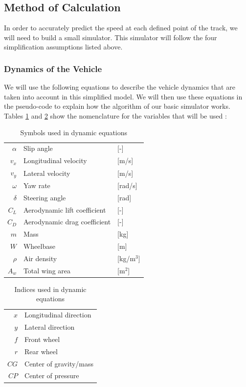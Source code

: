 \documentclass[a4paper, 11pt]{article}
\begin{document}
\subsection{Method of Calculation}

In order to accurately predict the speed at each defined point of the track, we will need to build a small simulator. This simulator will follow the four simplification assumptions listed above. 

\subsubsection{Dynamics of the Vehicle}

We will use the following equations to describe the vehicle dynamics that are taken into account in this simplified model. We will then use these equations in the pseudo-code to explain how the algorithm of our basic simulator works. Tables \ref{tab:DynamicSymbols} and \ref{tab:DynamicIndices} show the nomenclature for the variables that will be used :
\begin{table}[H]
	\centering
	\begin{tabular}{r | l  l}
		$\alpha$ & Slip angle & [-]\\
		$v_x$ & Longitudinal velocity & [m/s]\\
		$v_y$ & Lateral velocity & [m/s]\\
		$\omega$ & Yaw rate & [rad/s]\\
		$\delta$ & Steering angle & [rad]\\
		$C_L$ & Aerodynamic lift coefficient & [-]\\
		$C_D$ & Aerodynamic drag coefficient & [-]\\
		$m$ & Mass & [kg]\\
		$W$ & Wheelbase & [m]\\
		$\rho$ & Air density & [kg/m$^3$]\\
		$A_w$ & Total wing area & [m$^2$]
	\end{tabular}
	\caption{Symbols used in dynamic equations}
	\label{tab:DynamicSymbols}
\end{table}

\begin{table}[H]
	\centering
	\begin{tabular}{r | l}
		$x$ & Longitudinal direction\\
		$y$ & Lateral direction\\
		$f$ & Front wheel\\
		$r$ & Rear wheel\\
		$CG$ & Center of gravity/mass\\
		$CP$ & Center of pressure
	\end{tabular}
	\caption{Indices used in dynamic equations}
	\label{tab:DynamicIndices}
\end{table}
\end{document}
